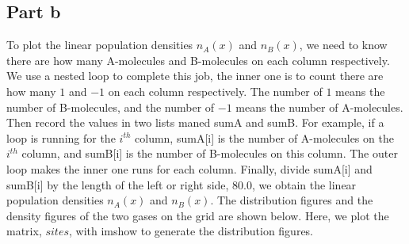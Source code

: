 \documentclass{article}
\begin{document}
\subsection{Part b}
\quad To plot the linear population densities $n_{A}(x)$ and $n_{B}(x)$, we need
to know there are how many A-molecules and B-molecules on each column
respectively. We use a nested loop to complete this job, the inner one is to
count there are how many $1$ and $-1$ on each column respectively. The
number of $1$ means the number of B-molecules, and the number of $-1$ means
the number of A-molecules. Then record the values in two lists maned sumA
and sumB. For example, if a loop is running for the $i^{th}$ column, sumA[i]
is the number of A-molecules on the $i^{th}$ column, and sumB[i] is the
number of B-molecules on this column. The outer loop makes the inner one
runs for each column. Finally, divide sumA[i] and sumB[i] by the length of
the left or right side, $80.0$, we obtain the linear population densities $%
n_{A}(x)$ and $n_{B}(x)$. The distribution figures and the density figures
of the two gases on the grid are shown below. Here, we plot the matrix, $%
sites$, with imshow to generate the distribution figures.
\begin{figure}[!ht]
	\centering
\end{figure}
\begin{figure}[!ht]
	\centering
\end{figure}
\end{document}
